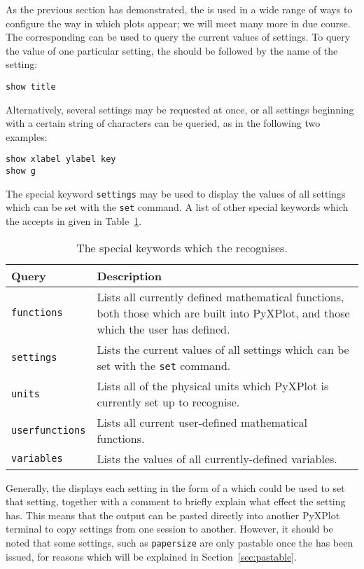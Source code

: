 As the previous section has demonstrated, the  is used in a wide
range of ways to configure the way in which plots appear; we will meet many
more in due course. The corresponding  can be used to query the
current values of settings. To query the value of one particular setting, the
 should be followed by the name of the setting:

\begin{verbatim}
show title
\end{verbatim}

\noindent Alternatively, several settings may be requested at once, or all
settings beginning with a certain string of characters can be queried, as in
the following two examples:

\begin{verbatim}
show xlabel ylabel key
show g
\end{verbatim}

\noindent The special keyword {\tt settings} may be used to display the values
of all settings which can be set with the {\tt set} command. A list of other
special keywords which the  accepts in given in
Table~\ref{tab:show_keywords}.

\begin{table}
\begin{center}
\begin{tabular}{|lp{9cm}|}
\hline
{\bf Query} & {\bf Description} \\ \hline
{\tt functions} & Lists all currently defined mathematical functions, both those which are built into PyXPlot, and those which the user has defined.\\
{\tt settings} & Lists the current values of all settings which can be set with the {\tt set} command.\\
{\tt units} & Lists all of the physical units which PyXPlot is currently set up to recognise.\\
{\tt userfunctions} & Lists all current user-defined mathematical functions.\\
{\tt variables} & Lists the values of all currently-defined variables.\\
\hline
\end{tabular}
\end{center}
\caption{The special keywords which the  recognises.}
\label{tab:show_keywords}
\end{table}

Generally, the  displays each setting in the form of a
 which could be used to set that setting, together with a comment
to briefly explain what effect the setting has. This means that the output can
be pasted directly into another PyXPlot terminal to copy settings from one
session to another. However, it should be noted that some settings, such as
{\tt papersize} are only pastable once the  has
been issued, for reasons which will be explained in Section~\ref{sec:pastable}.

